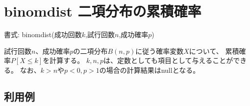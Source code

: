
%

\section{binomdist 二項分布の累積確率\label{sect:binomdist}}

書式: binomdist(成功回数$k$,試行回数$n$,成功確率$p$)

試行回数$n$、成功確率$p$の二項分布$B(n,p)$に従う確率変数$X$について、
累積確率$P[X\le k]$を計算する。
$k,n,p$は、定数としても項目として与えることができる。
なお、$k>n$や$p<0,p>1$の場合の計算結果はnullとなる。

\subsection*{利用例}


%

